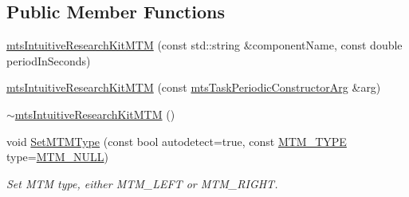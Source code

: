 \subsection*{Public Member Functions}
\begin{DoxyCompactItemize}
\item 
\hyperlink{classmts_intuitive_research_kit_m_t_m_a04f2e11f5ed0f396571f4587dc5f371c}{mts\-Intuitive\-Research\-Kit\-M\-T\-M} (const std\-::string \&component\-Name, const double period\-In\-Seconds)
\item 
\hyperlink{classmts_intuitive_research_kit_m_t_m_aefbd1fec629f58af7134be9bd901339e}{mts\-Intuitive\-Research\-Kit\-M\-T\-M} (const \hyperlink{classmts_task_periodic_constructor_arg}{mts\-Task\-Periodic\-Constructor\-Arg} \&arg)
\item 
\hyperlink{classmts_intuitive_research_kit_m_t_m_a96a009af92205b653fa01b1132eba4e2}{$\sim$mts\-Intuitive\-Research\-Kit\-M\-T\-M} ()
\item 
void \hyperlink{classmts_intuitive_research_kit_m_t_m_aa32b8d1cd28f2ef35c65307183dc777d}{Set\-M\-T\-M\-Type} (const bool autodetect=true, const \hyperlink{classmts_intuitive_research_kit_m_t_m_a2122075f3ef6c751e5bf65b690bf5b69}{M\-T\-M\-\_\-\-T\-Y\-P\-E} type=\hyperlink{classmts_intuitive_research_kit_m_t_m_a2122075f3ef6c751e5bf65b690bf5b69a9f51be777b8da63c667b740284ff3001}{M\-T\-M\-\_\-\-N\-U\-L\-L})
\begin{DoxyCompactList}\small\item\em Set M\-T\-M type, either M\-T\-M\-\_\-\-L\-E\-F\-T or M\-T\-M\-\_\-\-R\-I\-G\-H\-T. \end{DoxyCompactList}\end{DoxyCompactItemize}
